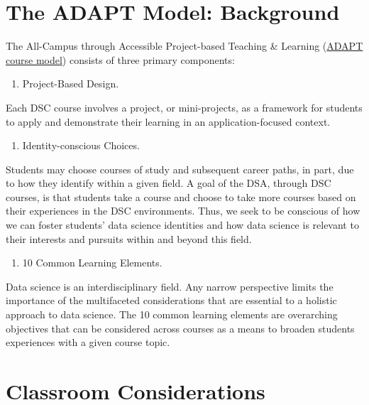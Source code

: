 \documentclass[
]{book}
\providecommand{\tightlist}{%
  \setlength{\itemsep}{0pt}\setlength{\parskip}{0pt}}
\begin{document}
\hypertarget{the-adapt-model-background}{%
\section{The ADAPT Model: Background}\label{the-adapt-model-background}}

The All-Campus through Accessible Project-based Teaching \& Learning (\href{https://datascienceacademy.ncsu.edu/courses/course-model/}{ADAPT course model}) consists of three primary components:

\begin{enumerate}
\def\labelenumi{\arabic{enumi})}
\tightlist
\item
  Project-Based Design.
\end{enumerate}

Each DSC course involves a project, or mini-projects, as a framework for students to apply and demonstrate their learning in an application-focused context.

\begin{enumerate}
\def\labelenumi{\arabic{enumi})}
\setcounter{enumi}{1}
\tightlist
\item
  Identity-conscious Choices.
\end{enumerate}

Students may choose courses of study and subsequent career paths, in part, due to how they identify within a given field. A goal of the DSA, through DSC courses, is that students take a course and choose to take more courses based on their experiences in the DSC environments. Thus, we seek to be conscious of how we can foster students' data science identities and how data science is relevant to their interests and pursuits within and beyond this field.

\begin{enumerate}
\def\labelenumi{\arabic{enumi})}
\setcounter{enumi}{2}
\tightlist
\item
  10 Common Learning Elements.
\end{enumerate}

Data science is an interdisciplinary field. Any narrow perspective limits the importance of the multifaceted considerations that are essential to a holistic approach to data science. The 10 common learning elements are overarching objectives that can be considered across courses as a means to broaden students experiences with a given course topic.

\hypertarget{classroom-considerations}{%
\section{Classroom Considerations}\label{classroom-considerations}}
\end{document}
